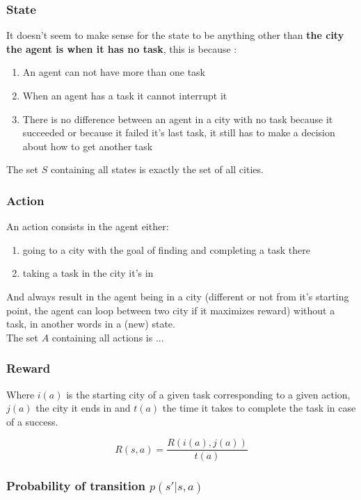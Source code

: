 \documentclass[11pt]{article}
\begin{document}
\subsubsection{State} 
It doesn't seem to make sense for the state to be anything other than \textbf{the city the agent is when it has no task}, this is because :
\begin{enumerate}
    \item An agent can not have more than one task
    \item When an agent has a task it cannot interrupt it
    \item There is no difference between an agent in a city with no task because it succeeded or because it failed it's last task, it still has to make a decision about how to get another task
\end{enumerate}

The set $S$ containing all states is exactly the set of all cities.

\subsubsection{Action}
An action consists in the agent either:
\begin{enumerate}
    \item going to a city with the goal of finding and completing a task there
    \item taking a task in the city it's in
\end{enumerate}
And always result in the agent being in a city (different or not from it's starting point, the agent can loop between two city if it maximizes reward) without a task, in another words in a (new) state. \\

The set $A$ containing all actions is ...
\subsubsection{Reward}

Where $i(a)$ is the starting city of a given task corresponding to a given action, $j(a)$ the city it ends in and $t(a)$ the time it takes to complete the task in case of a success.

\[R(s,a) = \frac{ R(i(a),j(a)) }{t(a)}\]

\subsubsection{Probability of transition $p(s'|s,a)$}
\end{document}

